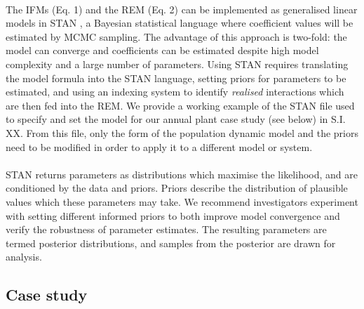 \documentclass[a4,12pt]{article}
\begin{document}
        \paragraph{}        
        The IFMs (Eq. 1) and the REM (Eq. 2) can be implemented as generalised linear models in STAN \citep{Carpenter2017}, a Bayesian statistical language where coefficient values will be estimated by MCMC sampling. The advantage of this approach is two-fold: the model can converge and coefficients can be estimated despite high model complexity and a large number of parameters. Using STAN requires translating the model formula into the STAN language, setting priors for parameters to be estimated, and using an indexing system to identify \textit{realised} interactions which are then fed into the REM. We provide a working example of the STAN file used to specify and set the model for our annual plant case study (see below) in S.I. XX. From this file, only the form of the population dynamic model and the priors need to be modified in order to apply it to a different model or system. 

        \paragraph{}
        STAN returns parameters as distributions which maximise the likelihood, and are conditioned by the data and priors. Priors describe the distribution of plausible values which these parameters may take. We recommend investigators experiment with setting different informed priors to both improve model convergence and verify the robustness of parameter estimates. The resulting parameters are termed posterior distributions, and samples from the posterior are drawn for analysis. 

    \subsection{Case study}
\end{document}
